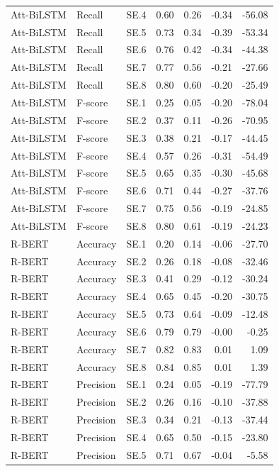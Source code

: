 \begin{tabular}{lllrrrr}
Att-BiLSTM & Recall & SE.4 & 0.60 & 0.26 & -0.34 & -56.08 \\
Att-BiLSTM & Recall & SE.5 & 0.73 & 0.34 & -0.39 & -53.34 \\
Att-BiLSTM & Recall & SE.6 & 0.76 & 0.42 & -0.34 & -44.38 \\
Att-BiLSTM & Recall & SE.7 & 0.77 & 0.56 & -0.21 & -27.66 \\
Att-BiLSTM & Recall & SE.8 & 0.80 & 0.60 & -0.20 & -25.49 \\
Att-BiLSTM & F-score & SE.1 & 0.25 & 0.05 & -0.20 & -78.04 \\
Att-BiLSTM & F-score & SE.2 & 0.37 & 0.11 & -0.26 & -70.95 \\
Att-BiLSTM & F-score & SE.3 & 0.38 & 0.21 & -0.17 & -44.45 \\
Att-BiLSTM & F-score & SE.4 & 0.57 & 0.26 & -0.31 & -54.49 \\
Att-BiLSTM & F-score & SE.5 & 0.65 & 0.35 & -0.30 & -45.68 \\
Att-BiLSTM & F-score & SE.6 & 0.71 & 0.44 & -0.27 & -37.76 \\
Att-BiLSTM & F-score & SE.7 & 0.75 & 0.56 & -0.19 & -24.85 \\
Att-BiLSTM & F-score & SE.8 & 0.80 & 0.61 & -0.19 & -24.23 \\
R-BERT & Accuracy & SE.1 & 0.20 & 0.14 & -0.06 & -27.70 \\
R-BERT & Accuracy & SE.2 & 0.26 & 0.18 & -0.08 & -32.46 \\
R-BERT & Accuracy & SE.3 & 0.41 & 0.29 & -0.12 & -30.24 \\
R-BERT & Accuracy & SE.4 & 0.65 & 0.45 & -0.20 & -30.75 \\
R-BERT & Accuracy & SE.5 & 0.73 & 0.64 & -0.09 & -12.48 \\
R-BERT & Accuracy & SE.6 & 0.79 & 0.79 & -0.00 & -0.25 \\
R-BERT & Accuracy & SE.7 & 0.82 & 0.83 & 0.01 & 1.09 \\
R-BERT & Accuracy & SE.8 & 0.84 & 0.85 & 0.01 & 1.39 \\
R-BERT & Precision & SE.1 & 0.24 & 0.05 & -0.19 & -77.79 \\
R-BERT & Precision & SE.2 & 0.26 & 0.16 & -0.10 & -37.88 \\
R-BERT & Precision & SE.3 & 0.34 & 0.21 & -0.13 & -37.44 \\
R-BERT & Precision & SE.4 & 0.65 & 0.50 & -0.15 & -23.80 \\
R-BERT & Precision & SE.5 & 0.71 & 0.67 & -0.04 & -5.58 \\

\end{tabular}

